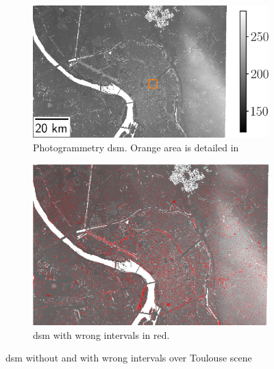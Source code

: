 \begin{figure}
    \begin{subfigure}[t]{0.549\linewidth}
        \flushleft
        \includegraphics[width=\linewidth]{Images/Chap_6/Toulouse_dsm.png}
        \caption{Photogrammetry \acrshort{dsm}. Orange area is detailed in }
        \label{fig:toulouse_dsm}
    \end{subfigure}
    \begin{subfigure}[t]{0.451\linewidth}
        \flushright
        \includegraphics[width=\linewidth]{Images/Chap_6/Toulouse_error.png}
        \caption{\acrshort{dsm} with wrong intervals in red.}
        \label{fig:toulouse_error}
    \end{subfigure}
    \caption{\acrshort{dsm} without and with wrong intervals over Toulouse scene}
    \label{fig:toulouse_global}
\end{figure}

